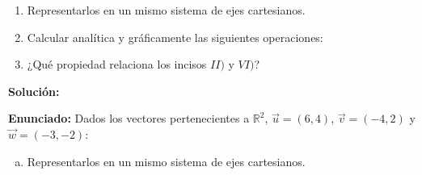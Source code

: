 \documentclass[11pt,a4paper]{article}
\begin{document}
\begin{enumerate}[\hspace{-5mm} 1) ]
    \begin{enumerate}[ a)] 
        \item Representarlos en un mismo sistema de ejes cartesianos.
        \item Calcular analítica y gráficamente las siguientes operaciones:
        \item ¿Qué propiedad relaciona los incisos {\scriptsize$II)$ }y {\scriptsize$VI)$}?
    \end{enumerate}





\textbf{Solución:}

\textbf{Enunciado:} Dados los vectores pertenecientes a $\mathbb{R}^2$, $\vec{u} = (6, 4)$, $\vec{v} = (-4, 2)$ y $\vec{w} = (-3, -2)$:

\begin{enumerate}[a) ]
    \item Representarlos en un mismo sistema de ejes cartesianos. 



\end{enumerate}
\end{enumerate}
\end{document}
